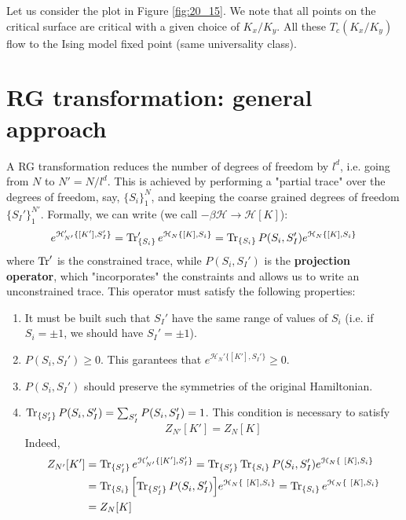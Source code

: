 \documentclass[../main/main.tex]{subfiles}
\begin{document}
Let us consider the plot in Figure \ref{fig:20_15}. We note that all points on the critical surface are critical with a given choice of \( K_x/K_y \). All these \( T_c (K_x/K_y) \) flow to the Ising model fixed point (same universality class).


\section{RG transformation: general approach}
A RG transformation reduces the number of degrees of freedom by \( l^d \), i.e. going from \( N \) to \( N' = N/l^d \).
This is achieved by performing a "partial trace" over the degrees of freedom, say, \( \{ S_i \}_1^N   \), and keeping the coarse grained degrees of freedom \( \{ S_I' \}_1^{N'}   \).
Formally, we can write (we call \( -\beta \mathcal{H} \rightarrow \mathcal{H}[K] \)):
\begin{equation}
  e^{\mathcal{H}_{N'}' \{ [K'],S_I' \}  } = \Tr_{\{ S_i \}  }' e^{ \mathcal{H}_N \{ [K],S_i \}  }  =
  \Tr_{\{ S_i \}  } P (S_i,S_I') e^{ \mathcal{H}_N \{ [K],S_i \}  }
\end{equation}
where \( \Tr'  \) is the constrained trace, while \( P (S_i,S_I')  \) is the \textbf{projection operator}, which "incorporates" the constraints and allows us to write an unconstrained trace. This operator must satisfy the following properties:
\begin{enumerate}

\item It must be built such that \( S_I' \) have the same range of values of \( S_i \) (i.e. if \( S_i = \pm 1 \), we should have \( S_I' = \pm1 \)).

\item \( P (S_i,S_I')\ge 0 \). This garantees that \( e^{\mathcal{H}_N' \{ [K'], S_I' \}  } \ge 0 \).

\item \( P (S_i, S_I') \) should preserve the symmetries of the original Hamiltonian.

\item \( \Tr_{\{ S_I' \}  } P (S_i,S_I') = \sum_{S_I'}^{}  P (S_i,S_I') = 1  \). This condition is necessary to satisfy
\begin{equation*}
  Z_{N'} [K'] = Z_N [K]
\end{equation*}
Indeed,
\begin{equation*}
\begin{split}
  Z_{N'} [K'] &= \Tr_{\{ S_I' \}  } e^{\mathcal{H}_{N'}' \{ [K'],S_I' \}  }
  = \Tr_{\{ S_I' \}  } \Tr_{\{ S_i \}  } P (S_i,S_{I}') e^{\mathcal{H}_N \{ [K],S_i \}  } \\
  & =  \Tr_{\{ S_i \}  }  \qty[ \Tr_{\{ S_I' \}  } P (S_i,S_I') ]   e^{\mathcal{H}_N \{ [K],S_i \}  }
   =  \Tr_{\{ S_i \}  }  e^{\mathcal{H}_N \{ [K],S_i \}  } \\ & = Z_N [K]
\end{split}
\end{equation*}

\end{enumerate}
\end{document}
